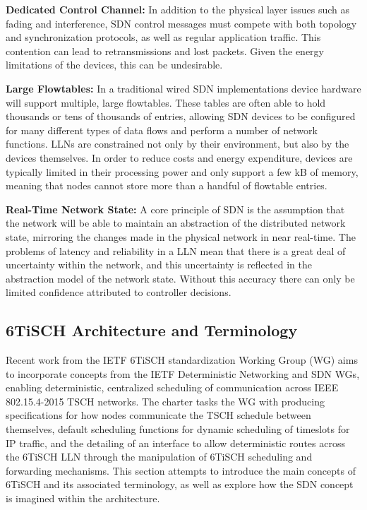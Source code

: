 \textbf{Dedicated Control Channel:} In addition to the physical layer issues such as fading and interference, SDN control messages must compete with both topology and synchronization protocols, as well as regular application traffic. This contention can lead to retransmissions and lost packets. Given the energy limitations of the devices, this can be undesirable.

\textbf{Large Flowtables:} In a traditional wired SDN implementations device hardware will support multiple, large flowtables. These tables are often able to hold thousands or tens of thousands of entries, allowing SDN devices to be configured for many different types of data flows and perform a number of network functions. LLNs are constrained not only by their environment, but also by the devices themselves. In order to reduce costs and energy expenditure,  devices are typically limited in their processing power and only support a few kB of memory, meaning that nodes cannot store more than a handful of flowtable entries.

\textbf{Real-Time Network State:} A core principle of SDN is the assumption that the network will be able to maintain an abstraction of the distributed network state, mirroring the changes made in the physical network in near real-time. The problems of latency and reliability in a LLN mean that there is a great deal of uncertainty within the network, and this uncertainty is reflected in the abstraction model of the network state. Without this accuracy there can only be limited confidence attributed to controller decisions.


\subsection{6TiSCH Architecture and Terminology}
\label{sec_6tisch_background}

Recent work from the IETF 6TiSCH standardization Working Group (WG) aims to incorporate concepts from the IETF Deterministic Networking \cite{ietf_detnet} and SDN \cite{ietf_sdn_rfc} WGs, enabling deterministic, centralized scheduling of communication across IEEE 802.15.4-2015 TSCH networks. The charter tasks the WG with producing specifications for how nodes communicate the TSCH schedule between themselves, default scheduling functions for dynamic scheduling of timeslots for IP traffic, and the detailing of an interface to allow deterministic routes across the 6TiSCH LLN through the manipulation of 6TiSCH scheduling and forwarding mechanisms. This section attempts to introduce the main concepts of 6TiSCH and its associated terminology, as well as explore how the SDN concept is imagined within the architecture.

